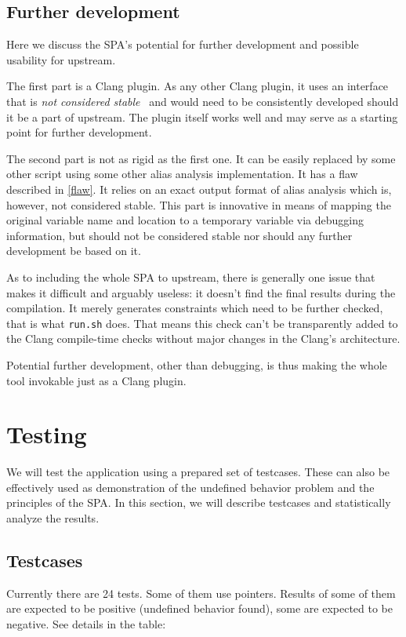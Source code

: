 \subsection{Further development}
Here we discuss the SPA's potential for further development and possible usability for upstream.

The first part is a Clang plugin. As any other Clang plugin, it uses an interface that is \emph{not considered stable}~\cite{clang-unstable} and would need to be consistently developed should it be a part of upstream. The plugin itself works well and may serve as a starting point for further development.

The second part is not as rigid as the first one. It can be easily replaced by some other script using some other alias analysis implementation. It has a flaw described in \ref{flaw}. It relies on an exact output format of alias analysis which is, however, not considered stable. This part is innovative in means of mapping the original variable name and location to a temporary variable via debugging information, but should not be considered stable nor should any further development be based on it.

As to including the whole SPA to upstream, there is generally one issue that makes it difficult and arguably useless: it doesn't find the final results during the compilation. It merely generates constraints which need to be further checked, that is what \verb|run.sh| does. That means this check can't be transparently added to the Clang compile-time checks without major changes in the Clang's architecture.

Potential further development, other than debugging, is thus making the whole tool invokable just as a Clang plugin.
\section{Testing}
We will test the application using a prepared set of testcases. These can also be effectively used as demonstration of the undefined behavior problem and the principles of the SPA.
In this section, we will describe testcases and statistically analyze the results.
\subsection{Testcases}
Currently there are 24 tests. Some of them use pointers. Results of some of them are expected to be positive (undefined behavior found), some are expected to be negative. See details in the table:\\

